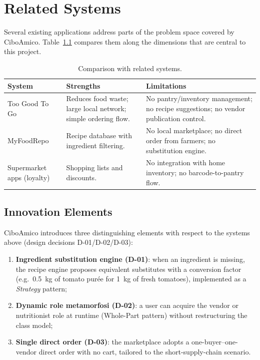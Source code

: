 \chapter{Related Systems}\label{ch:related}

Several existing applications address parts of the problem space covered by
CiboAmico. Table~\ref{tab:related} compares them along the dimensions that are
central to this project.

\begin{table}[H]
\centering
\caption{Comparison with related systems.}
\label{tab:related}
\begin{tabular}{@{}p{3.2cm}p{5.2cm}p{5.2cm}@{}}
\toprule
\textbf{System} & \textbf{Strengths} & \textbf{Limitations} \\
\midrule
Too Good To Go & Reduces food waste; large local network; simple ordering flow. & No pantry/inventory management; no recipe suggestions; no vendor publication control. \\
MyFoodRepo & Recipe database with ingredient filtering. & No local marketplace; no direct order from farmers; no substitution engine. \\
Supermarket apps (loyalty) & Shopping lists and discounts. & No integration with home inventory; no barcode-to-pantry flow. \\
\bottomrule
\end{tabular}
\end{table}

\section{Innovation Elements}

CiboAmico introduces three distinguishing elements with respect to the
systems above (design decisions D-01/D-02/D-03):

\begin{enumerate}
    \item \textbf{Ingredient substitution engine (D-01)}: when an ingredient is
    missing, the recipe engine proposes equivalent substitutes with a
    conversion factor (e.g.\ 0.5~kg of tomato purée for 1~kg of fresh
    tomatoes), implemented as a \emph{Strategy} pattern;
    \item \textbf{Dynamic role metamorfosi (D-02)}: a user can acquire the
    vendor or nutritionist role at runtime (Whole-Part pattern) without
    restructuring the class model;
    \item \textbf{Single direct order (D-03)}: the marketplace adopts a
    one-buyer--one-vendor direct order with no cart, tailored to the
    short-supply-chain scenario.
\end{enumerate}
